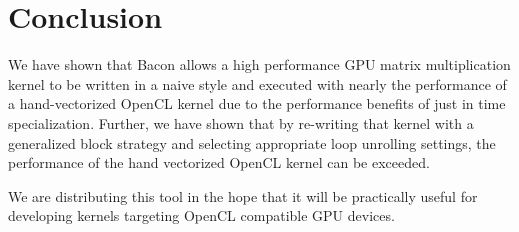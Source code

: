 \documentclass{llncs}
\begin{document}
\section{Conclusion}

We have shown that Bacon allows a high performance GPU matrix
multiplication kernel to be written in a naive style and executed with
nearly the performance of a hand-vectorized OpenCL kernel due to the
performance benefits of just in time specialization. Further, we have
shown that by re-writing that kernel with a generalized block strategy
and selecting appropriate loop unrolling settings, the performance of
the hand vectorized OpenCL kernel can be exceeded.

We are distributing this tool in the hope that it will be practically
useful for developing kernels targeting OpenCL compatible GPU devices.

{} 

\end{document}
